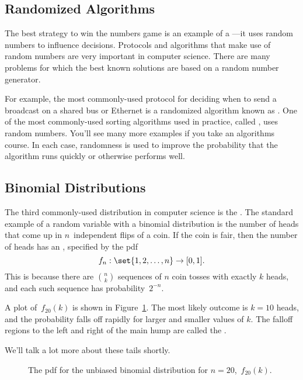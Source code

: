 \subsection{Randomized Algorithms}

The best strategy to win the numbers game is an example of a
 ---it uses random numbers to influence
decisions.  Protocols and algorithms that make use of random numbers
are very important in computer science.  There are many problems for
which the best known solutions are based on a random number generator.

For example, the most commonly-used protocol for deciding when to send
a broadcast on a shared bus or Ethernet is a randomized algorithm
known as .  One of the most commonly-used
sorting algorithms used in practice, called , uses
random numbers.  You'll see many more examples if you take an
algorithms course.  In each case, randomness is used to improve the
probability that the algorithm runs quickly or otherwise performs
well.

\subsection{Binomial Distributions}\label{binomial_distribution_section}

The third commonly-used distribution in computer science is the
.  The standard example of a random
variable with a binomial distribution is the number of heads that come
up in $n$~independent flips of a coin.  If the coin is fair, then the
number of heads has an ,
specified by the pdf
\[
    f_n: \set{1, 2, \dots, n} \to [0, 1].
\]
This is because there are $\binom{n}{k}$ sequences of $n$ coin tosses
with exactly $k$ heads, and each such sequence has probability~$2^{-n}$.

A plot of~$f_{20}(k)$ is shown in Figure~\ref{fig:16F5}.  The most
likely outcome is $k = 10$ heads, and the probability falls off
rapidly for larger and smaller values of $k$.  The falloff regions to
the left and right of the main hump are called the .

\begin{editingnotes}
We'll talk a lot more about these tails shortly.
\end{editingnotes}

\begin{figure}


\caption{The pdf for the unbiased binomial distribution for $n =
  20$,~$f_{20}(k)$.}

\label{fig:16F5}

\end{figure}

